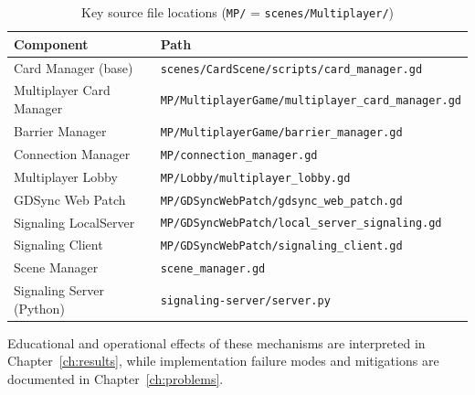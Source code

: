 \begin{table}[htbp]
    \centering
    \footnotesize
    \setlength{\tabcolsep}{4pt}
    \caption{Key source file locations (\texttt{MP/} = \texttt{scenes/Multiplayer/})}
    \label{tab:source-files}
    \begin{tabular}{@{}p{4.2cm}p{7.5cm}@{}}
        \toprule
        \textbf{Component}        & \textbf{Path}                                             \\
        \midrule
        Card Manager (base)       & \texttt{scenes/CardScene/scripts/card\_manager.gd}        \\
        Multiplayer Card Manager  & \texttt{MP/MultiplayerGame/multiplayer\_card\_manager.gd} \\
        Barrier Manager           & \texttt{MP/MultiplayerGame/barrier\_manager.gd}           \\
        Connection Manager        & \texttt{MP/connection\_manager.gd}                        \\
        Multiplayer Lobby         & \texttt{MP/Lobby/multiplayer\_lobby.gd}                   \\
        GDSync Web Patch          & \texttt{MP/GDSyncWebPatch/gdsync\_web\_patch.gd}          \\
        Signaling LocalServer     & \texttt{MP/GDSyncWebPatch/local\_server\_signaling.gd}    \\
        Signaling Client          & \texttt{MP/GDSyncWebPatch/signaling\_client.gd}           \\
        Scene Manager             & \texttt{scene\_manager.gd}                                \\
        Signaling Server (Python) & \texttt{signaling-server/server.py}                       \\
        \bottomrule
    \end{tabular}
\end{table}

\noindent Educational and operational effects of these mechanisms are interpreted in Chapter~\ref{ch:results}, while implementation failure modes and mitigations are documented in Chapter~\ref{ch:problems}.
